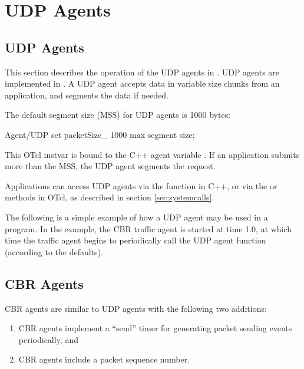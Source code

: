 \chapter{UDP Agents}
\label{sec:udpAgents}

\section{UDP Agents}
This section describes the operation of the UDP agents in \ns.
UDP agents are implemented in .  A UDP agent accepts
data in variable size chunks from an application, and segments the data 
if needed.

The default segment size (MSS) for UDP agents is 1000 bytes:
\begin{program}
Agent/UDP set packetSize_   1000              \; max segment size;
\end{program}
This OTcl instvar is bound to the C++ agent variable .  If an 
application submits more than the MSS, the UDP agent segments the 
 request.

Applications can access UDP agents via the  function in C++,
or via the  or  methods in OTcl, as described in
section \ref{sec:systemcalls}.  

The following is a simple example of how a UDP agent may be used in a program.  
In the example, the CBR traffic agent is started at time 1.0, at which time
the traffic agent begins to periodically call the UDP agent 
function (according to the \ns defaults).

\section{CBR Agents}
CBR agents are similar to UDP agents with the following two additions:
\begin{enumerate}
	\item CBR agents implement a ``send'' timer for generating packet
sending events periodically, and 
	\item CBR agents include a packet sequence number.
\end{enumerate}

